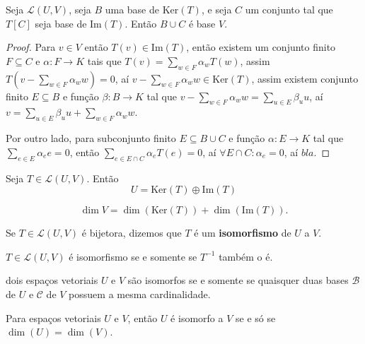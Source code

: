 \documentclass[11pt,twoside,a4paper]{book}
\begin{document}
\begin{teorema}
Seja $\mathcal{L}(U,V)$, seja $B$ uma base de $\mathrm{Ker}(T)$, e seja $C$ um conjunto tal que $T[C]$ seja base de $\mathrm{Im}(T)$. Então $B\cup C$ é base $V$.
\end{teorema}
\begin{proof}
Para $v\in V$ então $T(v)\in\mathrm{Im}(T)$, então existem um conjunto finito $F\subseteq C$ e $\alpha:F\rightarrow K$ tais que $T(v)=\sum\limits_{w\in F}\alpha_wT(w)$, assim $T\left(v-\sum\limits_{w\in F}\alpha_ww\right)=0$, aí $v-\sum\limits_{w\in F}\alpha_ww\in\mathrm{Ker}(T)$, assim existem conjunto finito $E\subseteq B$ e função $\beta:B\rightarrow K$ tal que $v-\sum\limits_{w\in F}\alpha_ww=\sum\limits_{u\in E}\beta_uu$, aí $v=\sum\limits_{u\in E}\beta_uu+\sum\limits_{w\in F}\alpha_ww$.

\medskip
\noindent
Por outro lado, para subconjunto finito $E\subseteq B\cup C$ e função $\alpha:E\rightarrow K$ tal que $\sum_{e\in E}\alpha_ee=0$, então $\sum_{e\in E\cap C}\alpha_eT(e)=0$, aí $\forall E\cap C:\alpha_e=0$, aí $bla$. 
\end{proof}

\begin{teorema} 
Seja $T \in \mathcal{L}(U,V).$ Então
\[
U = \mathrm{Ker}(T) \oplus \mathrm{Im}(T)
\]

\end{teorema}
\begin{corolario}
\[
\dim V=\dim(\mathrm{Ker}(T))+\dim(\mathrm{Im}(T)).
\]
\end{corolario}

\begin{definicao}
Se $T\in\mathcal{L}(U,V)$ é bijetora, dizemos que $T$ é um \textbf{isomorfismo} de $U$ a $V$.
\end{definicao}
\begin{proposicao}
$T \in \mathcal{L}(U,V)$ é isomorfismo se e somente se $T^{-1}$ também o é.
\end{proposicao}

\begin{proposicao}
dois espaços vetoriais $U$ e $V$ são isomorfos se e somente se quaisquer duas bases $\mathcal{B}$ de $U$ e $\mathcal{C}$ de $V$ possuem a mesma cardinalidade.
\end{proposicao}
\begin{teorema}
Para espaços vetoriais $U$ e $V$, então $U$ é isomorfo a $V$ se e só se $\dim(U)=\dim(V)$.
\end{teorema}
\end{document}
